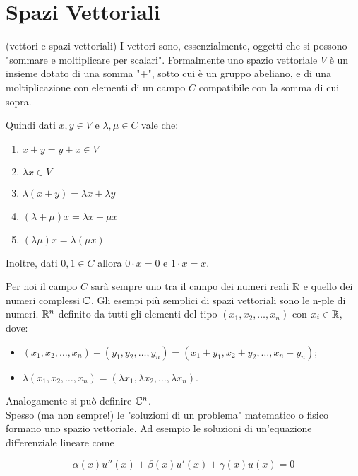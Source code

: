\chapter{Spazi Vettoriali}

\begin{definition}{(vettori e spazi vettoriali)}
I vettori sono, essenzialmente, oggetti che si possono "sommare e moltiplicare per scalari". Formalmente uno spazio vettoriale $V$ è un insieme dotato di una somma "$+$", sotto cui è un gruppo abeliano, e di una moltiplicazione con elementi di un campo $C$ compatibile con la somma di cui sopra. 
\end{definition}

Quindi dati $x,y \in V$ e $\lambda, \mu \in C$ vale che:

\begin{enumerate}
\item $x+y = y+x \in V$
\item $\lambda x \in V$
\item $\lambda(x+y) = \lambda x + \lambda y$
\item $(\lambda + \mu)x = \lambda x + \mu x$
\item $(\lambda \mu)x = \lambda (\mu x)$
\end{enumerate} 

Inoltre, dati $0,1 \in C$ allora $0 \cdot x = 0$ e $1 \cdot x = x$.

Per noi il campo $C$ sarà sempre uno tra il campo dei numeri reali $\mathbb R$ e quello dei numeri complessi $\mathbb C$. Gli esempi più semplici di spazi vettoriali sono le n-ple di numeri. $\mathbb R^n$ definito da tutti gli elementi del tipo $(x_1, x_2, \ldots , x_n)$ con $x_i \in \mathbb R$, dove:

\begin{itemize}
\item $(x_1, x_2, \ldots , x_n) + (y_1, y_2, \ldots , y_n) = (x_1 + y_1, x_2 + y_2,\ldots, x_n + y_n)$;
\item $\lambda (x_1, x_2, \ldots , x_n) = (\lambda x_1,\lambda x_2, \ldots , \lambda x_n)$.
\end{itemize} 

Analogamente si può definire $\mathbb C^n$.\\

Spesso (ma non sempre!) le "soluzioni di un problema" matematico o fisico formano uno spazio vettoriale. Ad esempio le soluzioni di un'equazione differenziale lineare come

\begin{equation}
\alpha(x) u''(x) + \beta(x) u'(x) + \gamma(x) u(x) = 0
\end{equation}
 
